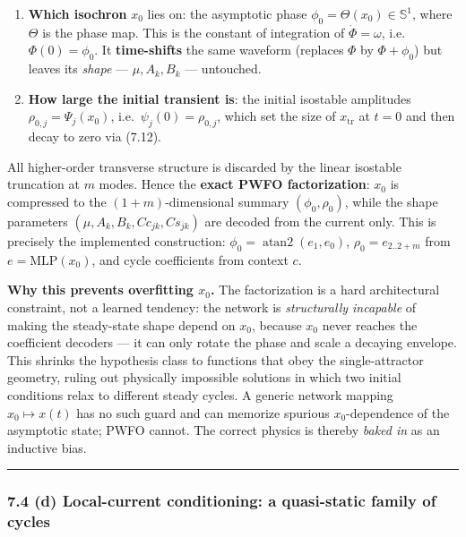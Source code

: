 \documentclass[
  11pt,
]{article}
\providecommand{\tightlist}{%
  \setlength{\itemsep}{0pt}\setlength{\parskip}{0pt}}
\begin{document}
\begin{enumerate}
\def\labelenumi{\arabic{enumi}.}
\tightlist
\item
  \textbf{Which isochron} \(x_0\) lies on: the asymptotic phase
  \(\phi_0=\Theta(x_0)\in\mathbb{S}^1\), where \(\Theta\) is the phase
  map. This is the constant of integration of \(\dot\Phi=\omega\),
  i.e.~\(\Phi(0)=\phi_0\). It \textbf{time-shifts} the same waveform
  (replaces \(\Phi\) by \(\Phi+\phi_0\)) but leaves its \emph{shape} ---
  \(\mu,A_k,B_k\) --- untouched.
\item
  \textbf{How large the initial transient is}: the initial isostable
  amplitudes \(\rho_{0,j}=\Psi_j(x_0)\), i.e.~\(\psi_j(0)=\rho_{0,j}\),
  which set the size of \(x_{\text{tr}}\) at \(t=0\) and then decay to
  zero via (7.12).
\end{enumerate}

All higher-order transverse structure is discarded by the linear
isostable truncation at \(m\) modes. Hence the \textbf{exact PWFO
factorization}: \(x_0\) is compressed to the \((1+m)\)-dimensional
summary \((\phi_0,\rho_0)\), while the shape parameters
\((\mu,A_k,B_k,Cc_{jk},Cs_{jk})\) are decoded from the current only.
This is precisely the implemented construction:
\(\phi_0=\operatorname{atan2}(e_1,e_0)\), \(\rho_0=e_{2..2+m}\) from
\(e=\mathrm{MLP}(x_0)\), and cycle coefficients from context \(c\).

\textbf{Why this prevents overfitting \(x_0\).} The factorization is a
hard architectural constraint, not a learned tendency: the network is
\emph{structurally incapable} of making the steady-state shape depend on
\(x_0\), because \(x_0\) never reaches the coefficient decoders --- it
can only rotate the phase and scale a decaying envelope. This shrinks
the hypothesis class to functions that obey the single-attractor
geometry, ruling out physically impossible solutions in which two
initial conditions relax to different steady cycles. A generic network
mapping \(x_0\mapsto x(t)\) has no such guard and can memorize spurious
\(x_0\)-dependence of the asymptotic state; PWFO cannot. The correct
physics is thereby \emph{baked in} as an inductive bias.

\begin{center}\rule{0.5\linewidth}{0.5pt}\end{center}

\subsubsection{7.4 (d) Local-current conditioning: a quasi-static family
of
cycles}\label{d-local-current-conditioning-a-quasi-static-family-of-cycles}
\end{document}
